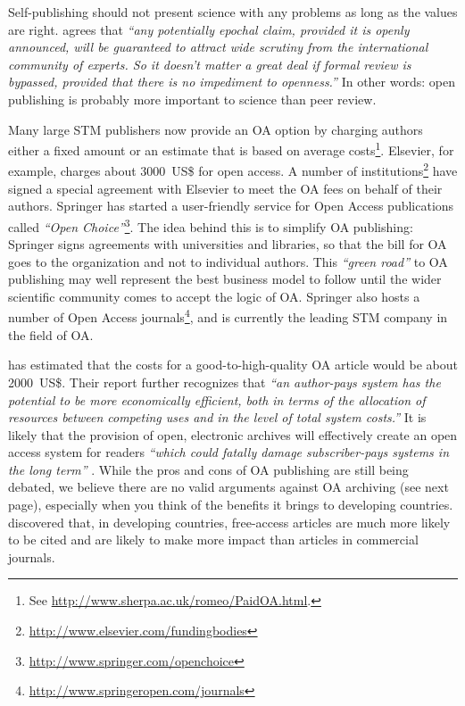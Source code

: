 \documentclass[graybox,envcountchap,sectrefs,UStrade]{svmono}
\begin{document}
Self-publishing should not present science with any problems as long as the values are right. \citet[p.85]{rees2004our} agrees that \emph{``any potentially epochal claim, provided it is openly announced, will be guaranteed to attract wide scrutiny from the international community of experts. So it doesn't matter a great deal if formal review is bypassed, provided that there is no impediment to openness.''} In other words: open publishing is probably more important to science than peer review.\par

Many large STM publishers now provide an OA option by charging authors either a fixed amount or an estimate that is based on average costs\footnote{See \url{http://www.sherpa.ac.uk/romeo/PaidOA.html}.}. Elsevier, for example, charges about 3000~US\$ for open access. A number of institutions\footnote{\url{http://www.elsevier.com/fundingbodies}} have signed a special agreement with Elsevier to meet the OA fees on behalf of their authors. Springer has started a user-friendly service for Open Access publications called \emph{``Open Choice''}\footnote{\url{http://www.springer.com/openchoice}}. The idea behind this is to simplify OA publishing: Springer signs agreements with universities and libraries, so that the bill for OA goes to the organization and not to individual authors. This \emph{``green road''} to OA publishing may well represent the best business model to follow until the wider scientific community comes to accept the logic of OA. Springer also hosts a number of Open Access journals\footnote{\url{http://www.springeropen.com/journals}}, and is currently the leading STM company in the field of OA.\par

\citet{WellcomeTrust2004} has estimated that the costs for a good-to-high-quality OA article would be about 2000~US\$. Their report further recognizes that \emph{``an author-pays system has the potential to be more economically efficient, both in terms of the allocation of resources between competing uses and in the level of total system costs.''} It is likely that the provision of open, electronic archives will effectively create an open access system for readers \emph{``which could fatally damage subscriber-pays systems in the long term''} \citep{WellcomeTrust2004}. While the pros and cons of OA publishing are still being debated, we believe there are no valid arguments against OA archiving (see next page), especially when you think of the benefits it brings to developing countries. \citet{Evans2009Science} discovered that, in developing countries, free-access articles are much more likely to be cited and are likely to make more impact than articles in commercial journals. \par
\end{document}
